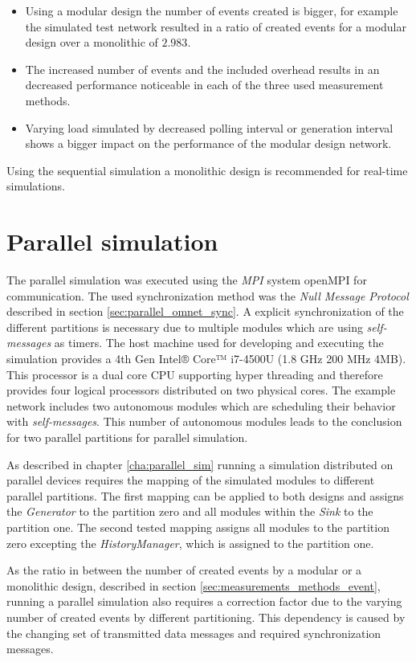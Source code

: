 \begin{itemize}
    \item Using a modular design the number of events created is bigger, for example the simulated test network resulted in a ratio of created events for a modular design over a monolithic of $2.983$.
    \item The increased number of events and the included overhead results in an decreased performance noticeable in each of the three used measurement methods.
    \item Varying load simulated by decreased polling interval or generation interval shows a bigger impact on the performance of the modular design network.
\end{itemize}

Using the sequential simulation a monolithic design is recommended for real-time simulations.


\section{Parallel simulation}
\label{sec:measurements_parallel}
The parallel simulation was executed using the \emph{MPI} system openMPI for communication.
The used synchronization method was the \emph{Null Message Protocol} described in section \ref{sec:parallel_omnet_sync}.
A explicit synchronization of the different partitions is necessary due to multiple modules which are using \emph{self-messages} as timers.
The host machine used for developing and executing the simulation provides a 4th Gen Intel® Core™ i7-4500U (1.8 GHz 200 MHz 4MB).
This processor is a dual core CPU supporting hyper threading and therefore provides four logical processors distributed on two physical cores.
The example network includes two autonomous modules which are scheduling their behavior with \emph{self-messages}.
This number of autonomous modules leads to the conclusion for two parallel partitions for parallel simulation.

As described in chapter \ref{cha:parallel_sim} running a simulation distributed on parallel devices requires the mapping of the simulated modules to different parallel partitions.
The first mapping can be applied to both designs and assigns the \emph{Generator} to the partition zero and all modules within the \emph{Sink} to the partition one.
The second tested mapping assigns all modules to the partition zero excepting the \emph{HistoryManager}, which is assigned to the partition one.

As the ratio in between the number of created events by a modular or a monolithic design, described in section \ref{sec:measurements_methods_event}, running a parallel simulation also requires a correction factor due to the varying number of created events by different partitioning.
This dependency is caused by the changing set of transmitted data messages and required synchronization messages.

